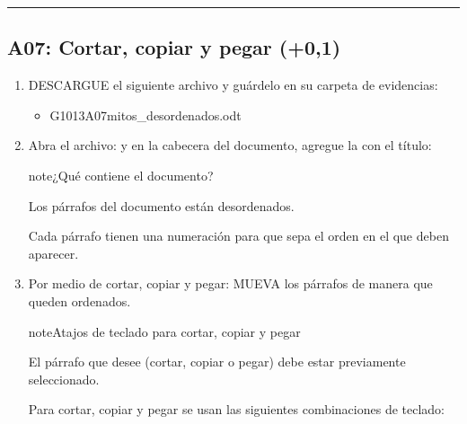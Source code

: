 \documentclass[letterpaper,10pt,spanish]{sphinxmanual}
\begin{document}
\bigskip\hrule\bigskip



\subsection{A07: Cortar, copiar y pegar  (+0,1)}
\label{\detokenize{1_guias/10ofimatica/G1013:a07-cortar-copiar-y-pegar-101-0-1}}
\sphinxAtStartPar
{}
\begin{enumerate}
%
\item {} 
\sphinxAtStartPar
DESCARGUE el siguiente archivo y guárdelo en su carpeta de evidencias:
\begin{itemize}
\item {} 
\sphinxAtStartPar
G1013A07\sphinxhyphen{}mitos\_desordenados.odt 

\end{itemize}

\item {} 
\sphinxAtStartPar
Abra el archivo:  y en la cabecera del documento, agregue la  con el título: 

\begin{sphinxadmonition}{note}{¿Qué contiene el documento?}

\sphinxAtStartPar
Los párrafos del documento están desordenados.

\sphinxAtStartPar
Cada párrafo tienen una numeración para que sepa el orden en el que deben aparecer.
\end{sphinxadmonition}

\item {} 
\sphinxAtStartPar
Por medio de cortar, copiar y pegar: MUEVA los párrafos de manera que queden ordenados.

\begin{sphinxadmonition}{note}{Atajos de teclado para cortar, copiar y pegar}

\sphinxAtStartPar
El párrafo que desee (cortar, copiar o pegar) debe estar previamente seleccionado.

\sphinxAtStartPar
Para cortar, copiar y pegar se usan las siguientes combinaciones de teclado:



\end{sphinxadmonition}
\end{enumerate}
\end{document}
